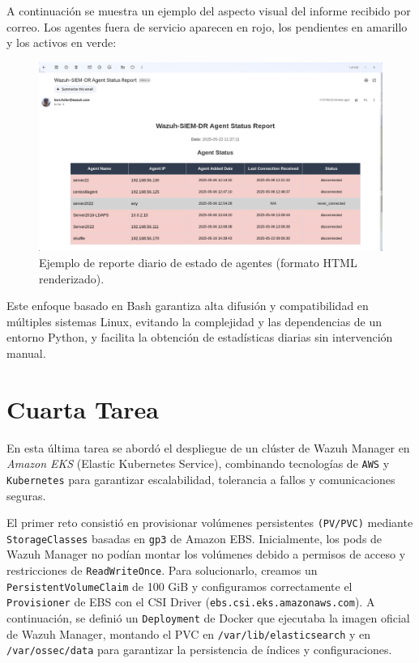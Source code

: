 A continuación se muestra un ejemplo del aspecto visual del informe recibido por correo. Los agentes fuera de servicio aparecen en rojo, los pendientes en amarillo y los activos en verde:

\begin{figure}[H]
  \centering
  \includegraphics[width=1.0\textwidth]{figures/wazuh_agent_report_example.png}
  \caption{Ejemplo de reporte diario de estado de agentes (formato HTML renderizado).}
  \label{fig:agent_report}
\end{figure}

Este enfoque basado en Bash garantiza alta difusión y compatibilidad en múltiples sistemas Linux, evitando la complejidad y las dependencias de un entorno Python, y facilita la obtención de estadísticas diarias sin intervención manual.

\section{Cuarta Tarea}
En esta última tarea se abordó el despliegue de un clúster de Wazuh Manager en \emph{Amazon EKS} (Elastic Kubernetes Service), combinando tecnologías de \texttt{AWS} y \texttt{Kubernetes} para garantizar escalabilidad, tolerancia a fallos y comunicaciones seguras\cite{Wazuh:Kubernetes:EKS:2025}.

El primer reto consistió en provisionar volúmenes persistentes \texttt{(PV/PVC)} mediante \texttt{StorageClasses} basadas en \texttt{gp3} de Amazon EBS\cite{AWS:EKS:StorageClass:gp3:2023}\cite{AWS:EBS:CSI:2025}. Inicialmente, los pods de Wazuh Manager no podían montar los volúmenes debido a permisos de acceso y restricciones de \texttt{ReadWriteOnce}\cite{Wazuh:Kubernetes:Storage:2025}. Para solucionarlo, creamos un \texttt{PersistentVolumeClaim} de 100 GiB y configuramos correctamente el \texttt{Provisioner} de EBS con el CSI Driver (\texttt{ebs.csi.eks.amazonaws.com})\cite{AWS:EBS:CSI:2025}. A continuación, se definió un \texttt{Deployment} de Docker que ejecutaba la imagen oficial de Wazuh Manager, montando el PVC en \texttt{/var/lib/elasticsearch} y en \texttt{/var/ossec/data} para garantizar la persistencia de índices y configuraciones\cite{Wazuh:Kubernetes:Storage:2025}.


